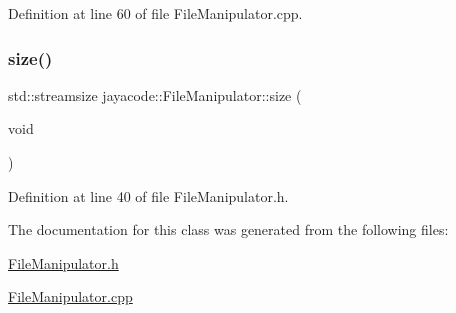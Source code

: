 Definition at line 60 of file File\+Manipulator.\+cpp.

\mbox{\label{classjayacode_1_1_file_manipulator_a2844059fa5a29cf6fa4da28c898e5c50}} 
\subsubsection{\texorpdfstring{size()}{size()}}
{\footnotesize\ttfamily std\+::streamsize jayacode\+::\+File\+Manipulator\+::size (\begin{DoxyParamCaption}\item[{void}]{ }\end{DoxyParamCaption})\hspace{0.3cm}{\ttfamily [inline]}}



Definition at line 40 of file File\+Manipulator.\+h.



The documentation for this class was generated from the following files\+:\begin{DoxyCompactItemize}
\item 
\hyperlink{_file_manipulator_8h}{File\+Manipulator.\+h}\item 
\hyperlink{_file_manipulator_8cpp}{File\+Manipulator.\+cpp}\end{DoxyCompactItemize}
